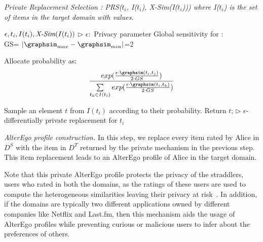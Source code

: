 
\begin{algorithm}[!htb]
\caption{\small\itshape Private Replacement Selection : PRS($t_i$, I($t_i$), \emph{X-Sim}(I($t_i$))) where I($t_i$) is the set of items in the target domain with \graphsim values.}
\label{Algo:prs}
\begin{algorithmic}[1]
\Require $\epsilon, t_i, I(t_i), \emph{X-Sim}(I(t_i))$		\hfill $\rhd$ $\epsilon:$ Privacy parameter
\State Global sensitivity for \graphsim:\\ GS= $|\graphsim_{max} - \graphsim_{min}|$=2

\State Allocate probability as:
\vspace{-3mm}
$$
\frac{exp(\frac{\epsilon \cdot \graphsim (t_i,t_j)}{2 \cdot GS})}{\sum \limits_{t_k \in I(t_i)} exp(\frac{\epsilon \cdot \graphsim (t_i,t_k)}{2 \cdot GS})}
$$
\vspace{-4mm}
\EndFor


\State Sample an element $t$ from $I(t_i)$ according to their probability.
\State Return $t$; \hfill $\rhd$ $\epsilon$-differentially private replacement for $t_i$
\end{algorithmic}
\end{algorithm}


{\it AlterEgo profile construction.} In this step, we replace every item rated by Alice in $D^S$ with the item in $D^T$ returned by the private mechanism in the previous step. This item replacement leads to an AlterEgo profile of Alice in the target domain.

Note that this private AlterEgo profile protects the privacy of the straddlers, users who rated in both the domains, as the ratings of these users are used to compute the heterogeneous similarities leaving their privacy at risk~\cite{ramakrishnan2001privacy}. In addition, if the domains are typically two different applications owned by different companies like Netflix and Last.fm, then this mechanism aids the usage of AlterEgo profiles while preventing curious or malicious users to infer about the preferences of others. 



